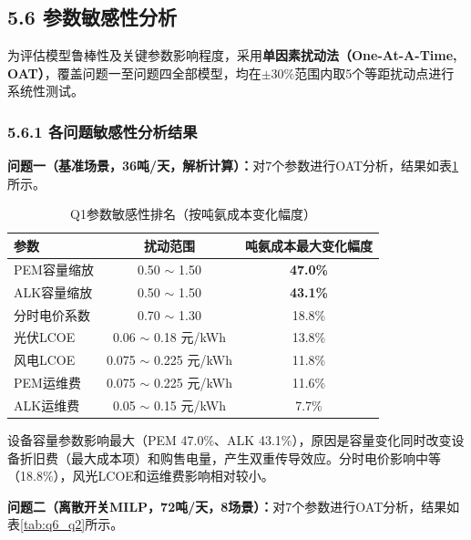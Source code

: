 \documentclass[zihao=-4,a4paper]{ctexart} %
\begin{document}
	\subsection*{5.6 参数敏感性分析}
	
	为评估模型鲁棒性及关键参数影响程度，采用\textbf{单因素扰动法（One-At-A-Time, OAT）}，覆盖问题一至问题四全部模型，均在$\pm30\%$范围内取5个等距扰动点进行系统性测试。
	
	\subsubsection*{5.6.1 各问题敏感性分析结果}
	
	\textbf{问题一（基准场景，36吨/天，解析计算）：}对7个参数进行OAT分析，结果如表\ref{tab:q6_q1}所示。
	
	\begin{table}[ht]
		\centering
		\small
		\caption{Q1参数敏感性排名（按吨氨成本变化幅度）}
		\label{tab:q6_q1}
		\begin{tabular}{lcc}
			\toprule
			参数 & 扰动范围 & 吨氨成本最大变化幅度 \\
			\midrule
			PEM容量缩放 & 0.50 $\sim$ 1.50 & \textbf{47.0\%} \\
			ALK容量缩放 & 0.50 $\sim$ 1.50 & \textbf{43.1\%} \\
			分时电价系数 & 0.70 $\sim$ 1.30 & 18.8\% \\
			光伏LCOE & 0.06 $\sim$ 0.18 元/kWh & 13.8\% \\
			风电LCOE & 0.075 $\sim$ 0.225 元/kWh & 11.8\% \\
			PEM运维费 & 0.075 $\sim$ 0.225 元/kWh & 11.6\% \\
			ALK运维费 & 0.05 $\sim$ 0.15 元/kWh & 7.7\% \\
			\bottomrule
		\end{tabular}
	\end{table}
	
	设备容量参数影响最大（PEM 47.0\%、ALK 43.1\%），原因是容量变化同时改变设备折旧费（最大成本项）和购售电量，产生双重传导效应。分时电价影响中等（18.8\%），风光LCOE和运维费影响相对较小。
	
	\textbf{问题二（离散开关MILP，72吨/天，8场景）：}对7个参数进行OAT分析，结果如表\ref{tab:q6_q2}所示。
	
\end{document}
